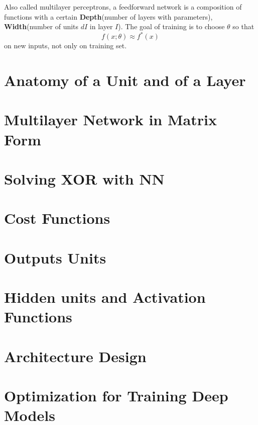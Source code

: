 Also called multilayer perceptrons, a feedforward network is a composition of functions
with a certain \textbf{Depth}(number of layers with parameters), \textbf{Width}(number
of units $dI$ in layer $I$). The goal of training is to choose $\theta$ so that $$f(x; \theta) \approx f^*(x)$$
on new inputs, not only on training set. 

\section{Anatomy of a Unit and of a Layer}


\section{Multilayer Network in Matrix Form}


\section{Solving XOR with NN}


\section{Cost Functions}


\section{Outputs Units}


\section{Hidden units and Activation Functions}


\section{Architecture Design}


\section{Optimization for Training Deep Models}
